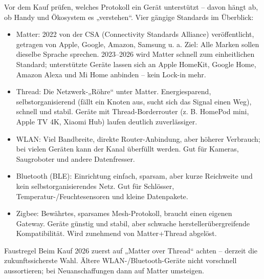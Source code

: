 


Vor dem Kauf prüfen, welches Protokoll ein Gerät unterstützt – davon hängt ab, ob Handy und Ökosystem es „verstehen“. Vier gängige Standards im Überblick:

\begin{itemize}
  \item Matter: 2022 von der CSA (Connectivity Standards Alliance) veröffentlicht, getragen von Apple, Google, Amazon, Samsung u. a. Ziel: Alle Marken sollen dieselbe Sprache sprechen. 2023–2026 wird Matter schnell zum einheitlichen Standard; unterstützte Geräte lassen sich an Apple HomeKit, Google Home, Amazon Alexa und Mi Home anbinden – kein Lock-in mehr.
  \item Thread: Die Netzwerk-„Röhre“ unter Matter. Energiesparend, selbstorganisierend (fällt ein Knoten aus, sucht sich das Signal einen Weg), schnell und stabil. Geräte mit Thread-Borderrouter (z. B. HomePod mini, Apple TV 4K, Xiaomi Hub) laufen deutlich zuverlässiger.
  \item WLAN: Viel Bandbreite, direkte Router-Anbindung, aber höherer Verbrauch; bei vielen Geräten kann der Kanal überfüllt werden. Gut für Kameras, Saugroboter und andere Datenfresser.
  \item Bluetooth (BLE): Einrichtung einfach, sparsam, aber kurze Reichweite und kein selbstorganisierendes Netz. Gut für Schlösser, Temperatur-/Feuchtesensoren und kleine Datenpakete.
  \item Zigbee: Bewährtes, sparsames Mesh-Protokoll, braucht einen eigenen Gateway. Geräte günstig und stabil, aber schwache herstellerübergreifende Kompatibilität. Wird zunehmend von Matter+Thread abgelöst.
\end{itemize}

\begin{tcbinfo}{Faustregel}
Beim Kauf 2026 zuerst auf „Matter over Thread“ achten – derzeit die zukunftssicherste Wahl. Ältere WLAN-/Bluetooth-Geräte nicht vorschnell aussortieren; bei Neuanschaffungen dann auf Matter umsteigen.

\end{tcbinfo}

